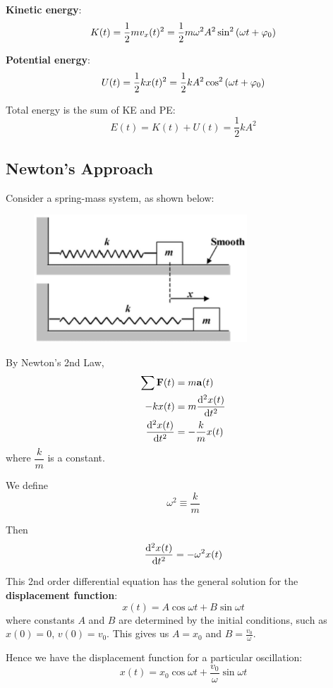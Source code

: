 \textbf{Kinetic energy}:
\begin{equation}
{K(t)=\frac{1}{2}mv_x(t)^2=\frac{1}{2}m\omega^2A^2\sin^2\left(\omega t+\varphi_0\right)
}\end{equation}

\textbf{Potential energy}:
\begin{equation}
{U(t)=\frac{1}{2}kx(t)^2=\frac{1}{2}kA^2\cos^2\left(\omega t+\varphi_0\right)
}\end{equation}

Total energy is the sum of KE and PE:
\begin{equation}
{E(t)=K(t)+U(t)=\frac{1}{2}kA^2
}\end{equation}

\subsection{Newton’s Approach}
Consider a spring-mass system, as shown below:
\begin{figure}[H]
    \centering
    \includegraphics[width=8cm]{images/spring_mass_system.png}
\end{figure}

By Newton's 2nd Law, 
\begin{align*}
\sum\vb{F}(t) &= m\vb{a}(t) \\
-kx(t) &= m\dv[2]{x(t)}{t} \\
\dv[2]{x(t)}{t} &= -\frac{k}{m}x(t)
\end{align*}
where $\dfrac{k}{m}$ is a constant.

We define
\[ \omega^2 \equiv \frac{k}{m} \]

Then \[ \dv[2]{x(t)}{t} = -\omega^2x(t) \]

This 2nd order differential equation has the general solution for the \textbf{displacement function}:
\[ x(t)=A\cos\omega t + B\sin\omega t \]
where constants $A$ and $B$ are determined by the initial conditions, such as $x(0)=0$, $v(0)=v_0$. This gives us $A=x_0$ and $B=\frac{v_0}{\omega}$. 

Hence we have the displacement function for a particular oscillation:
\[ \boxed{x(t)=x_0\cos\omega t + \frac{v_0}{\omega}\sin\omega t} \]

